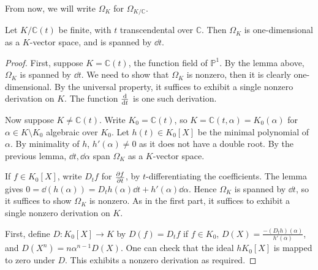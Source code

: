 From now, we will write \( \Omega_K \) for \( \Omega_{K/\mathbb C} \).
\begin{theorem}
    Let \( K/\mathbb C(t) \) be finite, with \( t \) transcendental over \( \mathbb C \).
    Then \( \Omega_K \) is one-dimensional as a \( K \)-vector space, and is spanned by \( \dd{t} \).
\end{theorem}
\begin{proof}
    First, suppose \( K = \mathbb C(t) \), the function field of \( \mathbb P^1 \).
    By the lemma above, \( \Omega_K \) is spanned by \( \dd{t} \).
    We need to show that \( \Omega_K \) is nonzero, then it is clearly one-dimensional.
    By the universal property, it suffices to exhibit a single nonzero derivation on \( K \).
    The function \( \dv{t} \) is one such derivation.

    Now suppose \( K \neq \mathbb C(t) \).
    Write \( K_0 = \mathbb C(t) \), so \( K = \mathbb C(t,\alpha) = K_0(\alpha) \) for \( \alpha \in K \setminus K_0 \) algebraic over \( K_0 \).
    Let \( h(t) \in K_0[X] \) be the minimal polynomial of \( \alpha \).
    By minimality of \( h \), \( h'(\alpha) \neq 0 \) as it does not have a double root.
    By the previous lemma, \( \dd{t}, \dd{\alpha} \) span \( \Omega_K \) as a \( K \)-vector space.

    If \( f \in K_0[X] \), write \( D_t f \) for \( \pdv{f}{t} \), by \( t \)-differentiating the coefficients.
    The lemma gives \( 0 = \dd{(h(\alpha))} = D_t h(\alpha) \dd{t} + h'(\alpha) \dd{\alpha} \).
    Hence \( \Omega_K \) is spanned by \( \dd{t} \), so it suffices to show \( \Omega_K \) is nonzero.
    As in the first part, it suffices to exhibit a single nonzero derivation on \( K \).

    First, define \( D \colon K_0[X] \to K \) by \( D(f) = D_t f \) if \( f \in K_0 \), \( D(X) = \frac{-(D_t h)(\alpha)}{h'(\alpha)} \), and \( D(X^n) = n\alpha^{n-1} D(X) \).
    One can check that the ideal \( hK_0[X] \) is mapped to zero under \( D \).
    This exhibits a nonzero derivation as required.
\end{proof}
